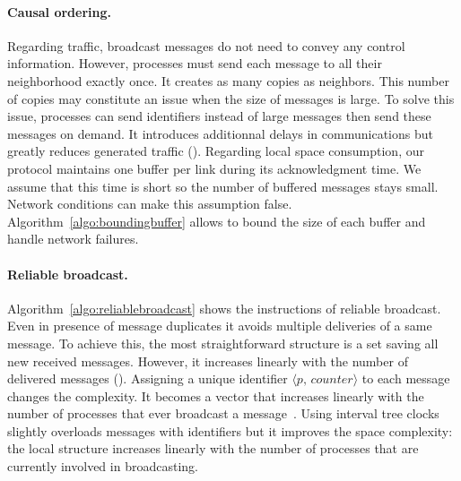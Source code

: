 \paragraph{Causal ordering.} Regarding traffic, broadcast messages do not need
to convey any control information. However, processes must send each message to
all their neighborhood exactly once. It creates as many copies as
neighbors. This number of copies may constitute an issue when the size of
messages is large. To solve this issue, processes can send identifiers instead
of large messages then send these messages on demand.  It introduces additionnal
delays in communications but greatly reduces generated traffic (\REF).
Regarding local space consumption, our protocol maintains one buffer per link
during its acknowledgment time. We assume that this time is short so the number
of buffered messages stays small. Network conditions can make this assumption
false. Algorithm~\ref{algo:boundingbuffer} allows to bound the size of each
buffer and handle network failures.


\paragraph{Reliable broadcast.} Algorithm~\ref{algo:reliablebroadcast} shows the
instructions of reliable broadcast. Even in presence of message duplicates it
avoids multiple deliveries of a same message. To achieve this, the most
straightforward structure is a set saving all new received messages. However, it
increases linearly with the number of delivered messages (\REF). Assigning a
unique identifier $\langle p,\, counter \rangle$ to each message changes the
complexity. It becomes a vector that increases linearly with the number of
processes that ever broadcast a message~\cite{fidge1988timestamps}. Using
interval tree clocks~\cite{almeida2008interval} slightly overloads messages with
identifiers but it improves the space complexity: the local structure increases
linearly with the number of processes that are currently involved in
broadcasting.


